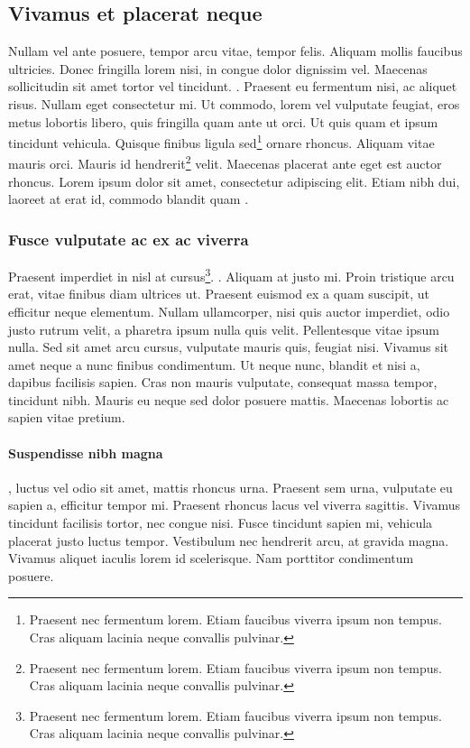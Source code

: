 \documentclass[a4paper,12pt,draft]{report}
\begin{document}
\subsection{Vivamus et placerat neque}

\citet{facsko2022_ssr} Nullam vel ante posuere, tempor arcu vitae, tempor felis. Aliquam mollis faucibus ultricies. Donec fringilla lorem nisi, in congue dolor dignissim vel. Maecenas sollicitudin sit amet tortor vel tincidunt. . Praesent eu fermentum nisi, ac aliquet risus. Nullam eget consectetur mi. Ut commodo, lorem vel vulputate feugiat, eros metus lobortis libero, quis fringilla quam ante ut orci. Ut quis quam et ipsum tincidunt vehicula. Quisque finibus ligula sed\footnote{Praesent nec fermentum lorem. Etiam faucibus viverra ipsum non tempus. Cras aliquam lacinia neque convallis pulvinar.} ornare rhoncus. Aliquam vitae mauris orci. Mauris id hendrerit\footnote{Praesent nec fermentum lorem. Etiam faucibus viverra ipsum non tempus. Cras aliquam lacinia neque convallis pulvinar.} velit. Maecenas placerat ante eget est auctor rhoncus. Lorem ipsum dolor sit amet, consectetur adipiscing elit. Etiam nibh dui, laoreet at erat id, commodo blandit quam \citep{janhunen2012gumics}.

\subsubsection{Fusce vulputate ac ex ac viverra}

Praesent imperdiet in nisl at cursus\footnote{Praesent nec fermentum lorem. Etiam faucibus viverra ipsum non tempus. Cras aliquam lacinia neque convallis pulvinar.}. . Aliquam at justo mi. Proin tristique arcu erat, vitae finibus diam ultrices ut. Praesent euismod ex a quam suscipit, ut efficitur neque elementum. Nullam ullamcorper, nisi quis auctor imperdiet, odio justo rutrum velit, a pharetra ipsum nulla quis velit. Pellentesque vitae ipsum nulla. Sed sit amet arcu cursus, vulputate mauris quis, feugiat nisi. Vivamus sit amet neque a nunc finibus condimentum. Ut neque nunc, blandit et nisi a, dapibus facilisis sapien. Cras non mauris vulputate, consequat massa tempor, tincidunt nibh. Mauris eu neque sed dolor posuere mattis. Maecenas lobortis ac sapien vitae pretium.

\paragraph{Suspendisse nibh magna}, luctus vel odio sit amet, mattis rhoncus urna. Praesent sem urna, vulputate eu sapien a, efficitur tempor mi. Praesent rhoncus lacus vel viverra sagittis. Vivamus tincidunt facilisis tortor, nec congue nisi. Fusce tincidunt sapien mi, vehicula placerat justo luctus tempor. Vestibulum nec hendrerit arcu, at gravida magna. Vivamus aliquet iaculis lorem id scelerisque. Nam porttitor condimentum posuere.
\end{document}
